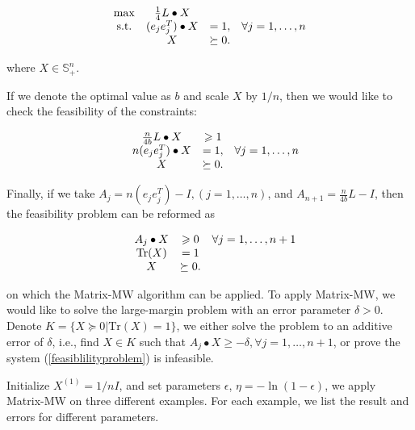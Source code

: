 \documentclass[12pt]{article}
\begin{document}
\begin{equation}\label{Originalproblem}
\begin{array}{c c c c}
\max & \frac{1}{4} L \bullet X &  & \\
\text{s.t.} & (e_je_j^T) \bullet X  & =  1,  & \forall j = 1,\dots, n \\ 
 & X  & \succeq  0. &
\end{array}
\end{equation}

where $X\in \mathbb S_+^n$.

If we denote the optimal value as $b$ and scale $X$ by $1/n$, then we would like to check the feasibility of the constraints: 


\begin{equation*}
\begin{array}{c c c c}
& \frac{n}{4b} L \bullet X & \geqslant 1 & \\
& n(e_je_j^T) \bullet X  & =  1,  & \forall j = 1,\dots, n \\ 
 & X  & \succeq  0. &
\end{array}
\end{equation*}

Finally, if we take $A_j = n(e_je_j^T) - I, (j = 1,\dots, n)$, and $A_{n+1} = \frac{n}{4b} L - I$, then the feasibility problem can be reformed as 

\begin{equation}\label{feasiblilityproblem}
\begin{array}{c c c c}
& A_j \bullet X & \geqslant 0 & \forall j = 1,\dots, n+1 \\
& \text{Tr}(X) & = 1 &\\ 
 & X  & \succeq  0. &
\end{array}
\end{equation}

on which the Matrix-MW algorithm can be applied. To apply Matrix-MW, we would like to solve the large-margin problem with an error parameter $\delta >0$. Denote $K = \{X \succeq 0 | \text{Tr}(X) = 1\}$, we either solve the problem to an additive error of $\delta$, i.e., find $X \in K$ such that $A_j \bullet X  \geqslant -\delta,  \forall j = 1,\dots, n+1$, or prove the system (\ref{feasiblilityproblem}) is infeasible.


Initialize $X^{(1)} = 1/n I$, and set parameters $\epsilon$, $\eta = -\ln(1-\epsilon)$, we apply Matrix-MW on three different examples. For each example, we list the result and errors for different parameters.
\end{document}
